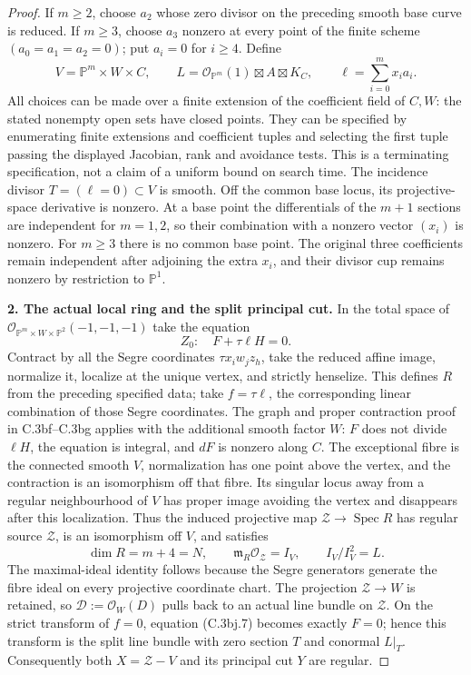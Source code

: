 \begin{proof}
If $m\ge2$, choose $a_2$ whose zero divisor on the preceding smooth
base curve is reduced. If $m\ge3$, choose $a_3$ nonzero at every
point of the finite scheme $(a_0=a_1=a_2=0)$; put $a_i=0$ for
$i\ge4$. Define
\[
 V=\mathbb P^m\times W\times C,\qquad
 L=\mathcal O_{\mathbb P^m}(1)\boxtimes A\boxtimes K_C,
 \qquad\ell=\sum_{i=0}^m x_i a_i.
 \tag{C.3bj.6}
\]
All choices can be made over a finite extension of the coefficient
field of $C,W$: the stated nonempty open sets have closed points.
They can be specified by enumerating finite extensions and coefficient
tuples and selecting the first tuple passing the displayed Jacobian,
rank and avoidance tests. This is a terminating specification, not a
claim of a uniform bound on search time.
The incidence divisor $T=(\ell=0)\subset V$ is smooth. Off the common
base locus, its projective-space derivative is nonzero. At a base
point the differentials of the $m+1$ sections are independent for
$m=1,2$, so their combination with a nonzero vector $(x_i)$ is nonzero.
For $m\ge3$ there is no common base point. The original three
coefficients remain independent after adjoining the extra $x_i$,
and their divisor cup remains nonzero by restriction to $\mathbb P^1$.

\textbf{2. The actual local ring and the split principal cut.}
In the total space of
$\mathcal O_{\mathbb P^m\times W\times\mathbb P^2}(-1,-1,-1)$
take the equation
\[
 Z_0:\quad F+\tau\ell H=0.
 \tag{C.3bj.7}
\]
Contract by all the Segre coordinates $\tau x_iw_jz_h$, take the
reduced affine image, normalize it, localize at the unique vertex,
and strictly henselize. This defines $R$ from the preceding specified
data; take $f=\tau\ell$, the corresponding linear combination of
those Segre coordinates. The graph and proper contraction proof in
C.3bf--C.3bg applies with the additional smooth factor $W$:
$F$ does not divide $\ell H$, the equation is integral, and $dF$
is nonzero along $C$. The exceptional fibre is the connected smooth
$V$, normalization has one point above the vertex, and the contraction
is an isomorphism off that fibre. Its singular locus away from a regular
neighbourhood of $V$ has proper image avoiding the vertex and disappears
after this localization. Thus the induced projective map
$\mathcal Z\to\operatorname{Spec}R$ has regular source $\mathcal Z$,
is an isomorphism off $V$, and satisfies
\[
 \dim R=m+4=N,\qquad
 \mathfrak m_R\mathcal O_{\mathcal Z}=I_V,\qquad I_V/I_V^2=L.
 \tag{C.3bj.8}
\]
The maximal-ideal identity follows because the Segre generators generate
the fibre ideal on every projective coordinate chart. The projection
$\mathcal Z\to W$ is retained, so $\mathcal D:=\mathcal O_W(D)$
pulls back to an actual line bundle on $\mathcal Z$.
On the strict transform of $f=0$, equation (C.3bj.7) becomes exactly
$F=0$; hence this transform is the split line bundle with zero section
$T$ and conormal $L|_T$. Consequently both $X=\mathcal Z-V$ and its
principal cut $Y$ are regular.


\end{proof}
